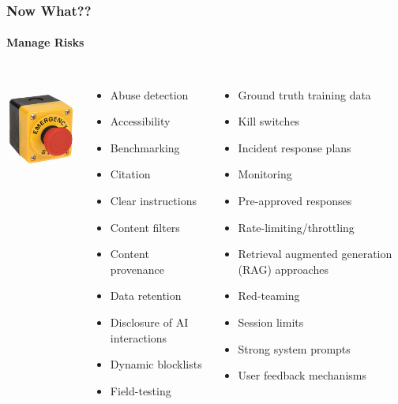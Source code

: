 \documentclass[11pt,
               aspectratio=169,
               hyperref={colorlinks}
               ]{beamer}
\begin{document}
		\begin{frame}[t]
			
			\frametitle{Now What??}
			\framesubtitle{Manage Risks}
			
			\begin{columns}
				
					\vspace{5pt}
					\centering
					\includegraphics[height=100pt]{../img/buzzer.png}
			
						
					\begin{itemize}\tiny
						\item Abuse detection
						\item Accessibility
						\item Benchmarking
						\item Citation						
						\item Clear instructions
						\item Content filters
						\item Content provenance						
						\item Data retention
						\item Disclosure of AI interactions
						\item Dynamic blocklists
						\item Field-testing
					\end{itemize}
					
					\begin{itemize}\tiny
						\item Ground truth training data
						\item Kill switches					
						\item Incident response plans
						\item Monitoring
						\item Pre-approved responses
						\item Rate-limiting/throttling 
						\item Retrieval augmented generation (RAG) approaches
						\item Red-teaming
						\item Session limits
						\item Strong system prompts
						\item User feedback mechanisms
					\end{itemize}
			

\end{columns}
\end{frame}
\end{document}
